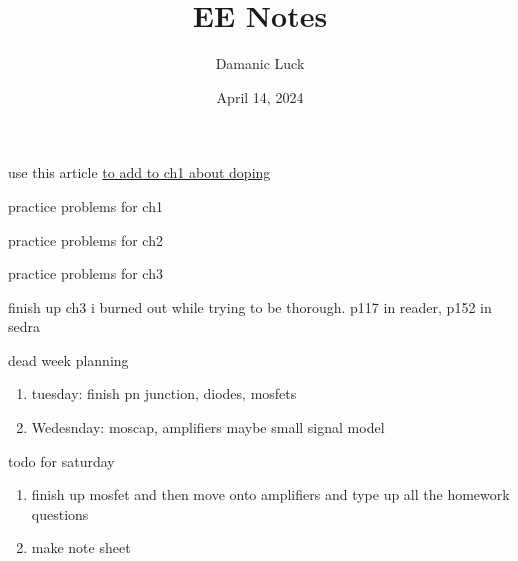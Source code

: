 \documentclass[10pt, openany]{book}
\title{EE Notes}
\author{Damanic Luck}
\date{April 14, 2024}
\begin{document}



\tableofcontents
\begin{todo}
    \item use this article \href{http://home.iitj.ac.in/~sptiwari/EE314/Lecture2_Semi_Basics_Junction.pdf}{to add to ch1 about doping}
    \item practice problems for ch1
    \item practice problems for ch2
    \item practice problems for ch3
    \item finish up ch3 i burned out while trying to be thorough. p117 in reader, p152 in sedra
    \item dead week planning
    \begin{enumerate}
        \item tuesday: finish pn junction, diodes, mosfets
        \item Wedesnday: moscap, amplifiers maybe small signal model
    \end{enumerate}
    \item todo for saturday
    \begin{enumerate}
        \item finish up mosfet and then move onto amplifiers and type up all the homework questions
        \item make note sheet
    \end{enumerate}
\end{todo}

\newpage


\newpage


\newpage


\newpage


\newpage 

\end{document}
